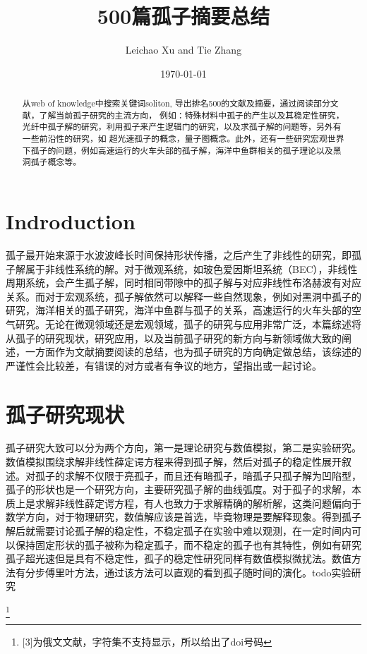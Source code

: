 \documentclass{article}
\begin{document}
\title{500篇孤子摘要总结}

\author{Leichao Xu and Tie Zhang}

\date{\today}



\maketitle
\begin{abstract}
从web of knowledge中搜索关键词soliton, 导出排名500的文献及摘要，通过阅读部分文献，了解当前孤子研究的主流方向，
例如：特殊材料中孤子的产生以及其稳定性研究，光纤中孤子解的研究，利用孤子来产生逻辑门的研究，以及求孤子解的问题等，另外有一些前沿性的研究，如
超光速孤子的概念，量子图概念。此外，还有一些研究宏观世界下孤子的问题，例如高速运行的火车头部的孤子解，海洋中鱼群相关的孤子理论以及黑洞孤子概念等。
\end{abstract}
\begin{multicols}{2}
\section{Indroduction}
孤子最开始来源于水波波峰长时间保持形状传播，之后产生了非线性的研究，即孤子解属于非线性系统的解。对于微观系统，如玻色爱因斯坦系统（BEC），非线性周期系统，会产生孤子解，同时相同带隙中的孤子解与对应非线性布洛赫波有对应关系\cite{Zhang.2009}。而对于宏观系统，孤子解依然可以解释一些自然现象，例如对黑洞中孤子的研究\cite{dymnikova2020regular}，海洋相关的孤子研究\cite{stepanyants2020nonlinear,zhao2019the}，海洋中鱼群与孤子的关系\cite{soliton_russion}，高速运行的火车头部的空气研究\cite{soliton_russion}。无论在微观领域还是宏观领域，孤子的研究与应用非常广泛，本篇综述将从孤子的研究现状，研究应用，以及当前孤子研究的新方向与新领域做大致的阐述，一方面作为文献摘要阅读的总结，也为孤子研究的方向确定做总结，该综述的严谨性会比较差，有错误的对方或者有争议的地方，望指出或一起讨论。

\section{孤子研究现状}
孤子研究大致可以分为两个方向，第一是理论研究与数值模拟，第二是实验研究。数值模拟围绕求解非线性薛定谔方程来得到孤子解，然后对孤子的稳定性展开叙述。对孤子的求解不仅限于亮孤子，而且还有暗孤子\cite{article,2017Decay}，暗孤子只孤子解为凹陷型，孤子的形状也是一个研究方向，主要研究孤子解的曲线弧度\cite{Umbetova_2019}。对于孤子的求解，本质上是求解非线性薛定谔方程\cite{soliton_russion2}，有人也致力于求解精确的解析解\cite{2020Exact,inproceedings}，这类问题偏向于数学方向，对于物理研究，数值解应该是首选，毕竟物理是要解释现象。得到孤子解后就需要讨论孤子解的稳定性，不稳定孤子在实验中难以观测，在一定时间内可以保持固定形状的孤子被称为稳定孤子，而不稳定的孤子也有其特性，例如有研究孤子超光速但是具有不稳定性\cite{1937-1632_2020_8_2285}，孤子的稳定性研究同样有数值模拟微扰法\cite{article_stable}。数值方法有分步傅里叶方法\cite{article_step}，通过该方法可以直观的看到孤子随时间的演化。todo实验研究
\end{multicols}

%


\footnote{[3]为俄文文献，字符集不支持显示，所以给出了doi号码} 
\end{document}
